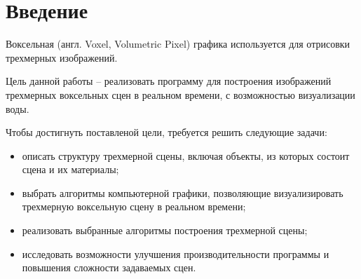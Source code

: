 \chapter*{Введение}

Воксельная (англ. Voxel, Volumetric Pixel) графика используется для отрисовки 
трехмерных изображений. 

Цель данной работы -- реализовать программу для построения 
изображений трехмерных воксельных сцен в реальном времени,
с возможностью визуализации воды.

Чтобы достигнуть поставленой цели, требуется решить следующие задачи:
\begin{itemize}
    \item описать структуру трехмерной сцены, включая объекты, из которых
          состоит сцена и их материалы;
    \item выбрать алгоритмы компьютерной 
          графики, позволяющие визуализировать трехмерную воксельную
          сцену в реальном времени;
    \item реализовать выбранные алгоритмы построения трехмерной сцены;
    \item исследовать возможности улучшения производительности программы
          и повышения сложности задаваемых сцен.
\end{itemize}
